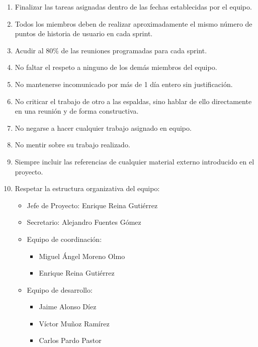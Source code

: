 \documentclass[]{article}
\begin{document}
\begin{enumerate}
	\item{Finalizar las tareas asignadas dentro de las fechas establecidas por el equipo.}
	\item{Todos los miembros deben de realizar aproximadamente el mismo número de puntos de historia de usuario en cada sprint.}
	\item{Acudir al 80\% de las reuniones programadas para cada sprint.}
	\item{No faltar el respeto a ninguno de los demás miembros del equipo.}
	\item{No mantenerse incomunicado por más de 1 día entero sin 	justificación.}
	\item{No criticar el trabajo de otro a las espaldas, sino hablar de ello directamente en una reunión y de forma constructiva.}
	\item{No negarse a hacer cualquier trabajo asignado en equipo.}
	\item{No mentir sobre su trabajo realizado.}
	\item{Siempre incluir las referencias de cualquier material externo introducido en el proyecto.}
	
	\clearpage
	\item{Respetar la estructura organizativa del equipo:}
	
	\begin{itemize}
	
		\item{Jefe de Proyecto: Enrique Reina Gutiérrez}
		\item{Secretario: Alejandro Fuentes Gómez}
		\item{Equipo de coordinación:}
			
		\begin{itemize}
	
			\item{Miguel Ángel Moreno Olmo}
			\item{Enrique Reina Gutiérrez}
			
		\end{itemize}
		
		\item{Equipo de desarrollo:}
			
		\begin{itemize}
	
			\item{Jaime Alonso Díez}
			\item{Víctor Muñoz Ramírez}
			\item{Carlos Pardo Pastor}
			

\end{itemize}
\end{itemize}
\end{enumerate}
\end{document}

